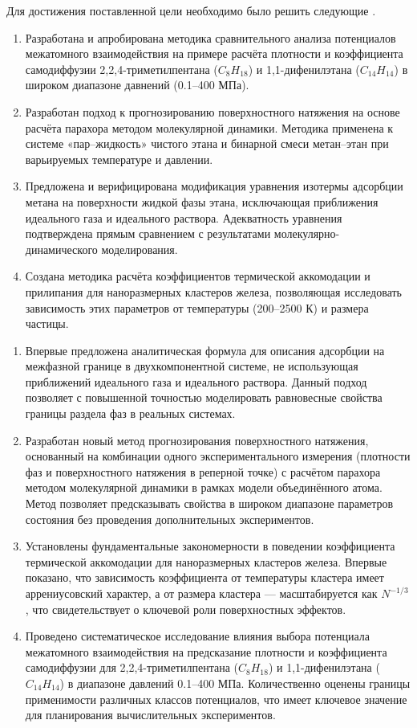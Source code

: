 Для достижения поставленной цели необходимо было решить следующие {\tasks}.
\begin{enumerate}[beginpenalty=10000]
  \item Разработана и апробирована методика сравнительного анализа потенциалов межатомного взаимодействия на примере расчёта плотности и коэффициента самодиффузии 2,2,4-триметилпентана ($C_8H_{18}$) и 1,1-дифенилэтана ($C_{14}H_{14}$) в широком диапазоне давнений (0.1–400 МПа). 
  \item Разработан подход к прогнозированию поверхностного натяжения на основе расчёта парахора методом молекулярной динамики. Методика применена к системе «пар–жидкость» чистого этана и бинарной смеси метан–этан при варьируемых температуре и давлении.
  \item Предложена и верифицирована модификация уравнения изотермы адсорбции метана на поверхности жидкой фазы этана, исключающая приближения идеального газа и идеального раствора. Адекватность уравнения подтверждена прямым сравнением с результатами молекулярно-динамического моделирования.
  \item Создана методика расчёта коэффициентов термической аккомодации и прилипания для наноразмерных кластеров железа, позволяющая исследовать зависимость этих параметров от температуры (200–2500 К) и размера частицы.
\end{enumerate}

{\novelty}
\begin{enumerate}[beginpenalty=10000] %
  \item Впервые предложена аналитическая формула для описания адсорбции на межфазной границе в двухкомпонентной системе, не использующая приближений идеального газа и идеального раствора. Данный подход позволяет с повышенной точностью моделировать равновесные свойства границы раздела фаз в реальных системах.
  \item Разработан новый метод прогнозирования поверхностного натяжения, основанный на комбинации одного экспериментального измерения (плотности фаз и поверхностного натяжения в реперной точке) с расчётом парахора методом молекулярной динамики в рамках модели объединённого атома. Метод позволяет предсказывать свойства в широком диапазоне параметров состояния без проведения дополнительных экспериментов.
  \item Установлены фундаментальные закономерности в поведении коэффициента термической аккомодации для наноразмерных кластеров железа. Впервые показано, что зависимость коэффициента от температуры кластера имеет аррениусовский характер, а от размера кластера — масштабируется как $N^{-1/3}$, что свидетельствует о ключевой роли поверхностных эффектов.
  \item Проведено систематическое исследование влияния выбора потенциала межатомного взаимодействия на предсказание плотности и коэффициента самодиффузии для 2,2,4-триметилпентана ($C_8H_{18}$) и 1,1-дифенилэтана ($C_{14}H_{14}$) в диапазоне давлений 0.1–400 МПа. Количественно оценены границы применимости различных классов потенциалов, что имеет ключевое значение для планирования вычислительных экспериментов.
\end{enumerate}

